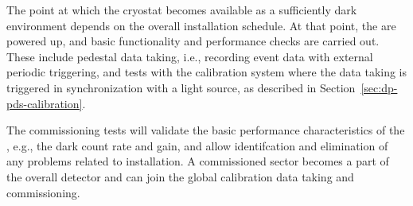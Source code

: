 The point at which the cryostat becomes available as a sufficiently dark environment depends on the overall installation schedule. At that point, the  are powered up, and basic functionality and performance checks are carried out. These include pedestal data taking, i.e., recording event data with external periodic triggering, and tests with the calibration system where the data taking is triggered in synchronization with a light source, as described in Section~\ref{sec:dp-pds-calibration}.

The commissioning tests will validate the basic performance characteristics of the , e.g., the dark count rate and gain, and allow identifcation and elimination of %
any problems related to installation. %
A commissioned sector becomes a part of the overall detector and can join the global calibration data taking and commissioning.


